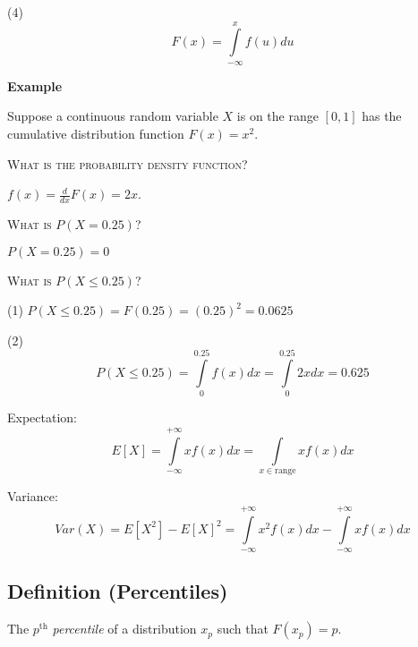 (4) \[ F(x)=\int\limits_{-\infty}^{x} f(u) d{u} \]

\textbf{Example}

Suppose a continuous random variable $ X $ is on the range $ [0,1] $ has the
cumulative distribution function $ F(x)=x^2 $.

\textsc{What is the probability density function?}

$ f(x)=\frac{d}{dx} F(x)=2x $.

\textsc{What is $ P(X=0.25) $?}

$ P(X=0.25)=0 $

\textsc{What is $ P(X\le 0.25) $?}

(1) $ P(X\le 0.25)=F(0.25)=(0.25)^2=0.0625 $

(2)
\[  P(X\le 0.25)=
    \int\limits_{0}^{0.25} f(x) d{x} =\int\limits_{0}^{0.25} 2x d{x} =0.625 \]

\begin{defbox}
    Expectation:
    \[ E[X]=\int\limits_{-\infty}^{+\infty} x f
        (x) d{x} =
        \int\limits_{x\in\text{range}}^{} x f
        (x) d{x}  \]
\end{defbox}

\begin{defbox}
    Variance:
    \[ Var(X)=E[X^2]-E[X]^2=\int\limits_{-\infty}^{+\infty} x^2f(x) d{x}-
        \int\limits_{-\infty}^{+\infty} x f
        (x) d{x} \]
\end{defbox}

\begin{defbox}
    \subsection{Definition (Percentiles)}
    The $ p^\text{th} $ \emph{percentile} of a distribution $ x_p $ such that
    $ F(x_p)=p $.
\end{defbox}
